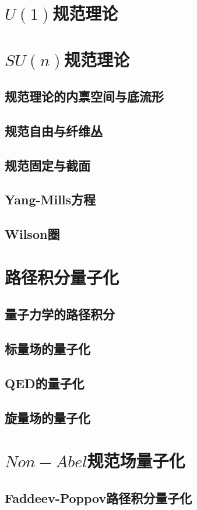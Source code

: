\documentclass[a4paper,11pt]{article}
\begin{document}
\section{$U(1)$规范理论}
\section{$SU(n)$规范理论}
\subsection{规范理论的内禀空间与底流形}
\subsection{规范自由与纤维丛}
\subsection{规范固定与截面}
\subsection{Yang-Mills方程}
\subsection{Wilson圈}
\section{路径积分量子化}
\subsection{量子力学的路径积分}
\subsection{标量场的量子化}
\subsection{QED的量子化}
\subsection{旋量场的量子化}
\section{$Non-Abel$规范场量子化}
\subsection{Faddeev-Poppov路径积分量子化}
\end{document}
